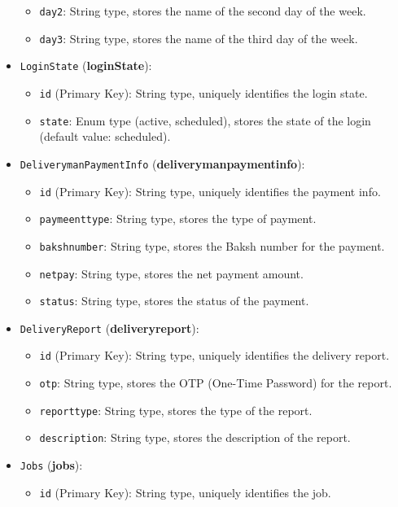 \begin{itemize}
\begin{itemize}
        \item \texttt{day2}: String type, stores the name of the second day of the week.
        \item \texttt{day3}: String type, stores the name of the third day of the week.
    \end{itemize}
    \item \texttt{LoginState} (\textbf{loginState}):
    \begin{itemize}
        \item \texttt{id} (Primary Key): String type, uniquely identifies the login state.
        \item \texttt{state}: Enum type (active, scheduled), stores the state of the login (default value: scheduled).
    \end{itemize}
    \item \texttt{DeliverymanPaymentInfo} (\textbf{deliverymanpaymentinfo}):
    \begin{itemize}
        \item \texttt{id} (Primary Key): String type, uniquely identifies the payment info.
        \item \texttt{paymeenttype}: String type, stores the type of payment.
        \item \texttt{bakshnumber}: String type, stores the Baksh number for the payment.
        \item \texttt{netpay}: String type, stores the net payment amount.
        \item \texttt{status}: String type, stores the status of the payment.
    \end{itemize}
    \item \texttt{DeliveryReport} (\textbf{deliveryreport}):
    \begin{itemize}
        \item \texttt{id} (Primary Key): String type, uniquely identifies the delivery report.
        \item \texttt{otp}: String type, stores the OTP (One-Time Password) for the report.
        \item \texttt{reporttype}: String type, stores the type of the report.
        \item \texttt{description}: String type, stores the description of the report.
    \end{itemize}
    \item \texttt{Jobs} (\textbf{jobs}):
    \begin{itemize}
        \item \texttt{id} (Primary Key): String type, uniquely identifies the job.

\end{itemize}
\end{itemize}

